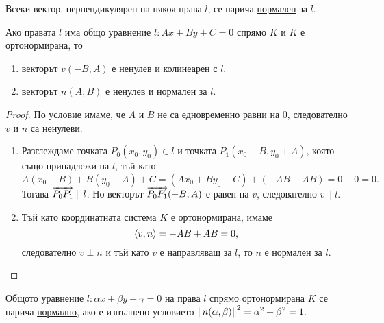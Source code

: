 \documentclass[numbers=endperiod, DIV=15]{scrartcl}
\begin{document}
\begin{definition}
  Всеки вектор, перпендикулярен на някоя права $l$, се нарича \underline{нормален} за $l$.
\end{definition}

\begin{proposition}
  Ако правата $l$ има общо уравнение $l: Ax + By + C = 0$ спрямо $K$ и $K$ е ортонормирана, то
  \begin{enumerate}
    \item векторът $v(-B, A)$ е ненулев и колинеарен с $l$.
    \item векторът $n(A, B)$ е ненулев и нормален за $l$.
  \end{enumerate}
\end{proposition}
\begin{proof}
  По условие имаме, че $A$ и $B$ не са едновременно равни на $0$, следователно $v$ и $n$ са ненулеви.
  \begin{enumerate}
    \item Разглеждаме точката $P_0(x_0, y_0) \in l$ и точката $P_1(x_0 - B, y_0 + A)$, която също принадлежи на $l$, тъй като
    \begin{displaymath}
      A(x_0 - B) + B(y_0 + A) + C = (Ax_0 + By_0 + C) + (-AB + AB) = 0 + 0 = 0.
    \end{displaymath}
     Тогава $\overrightarrow{P_0 P_1} \parallel l$. Но векторът $\overrightarrow{P_0 P_1}(-B, A)$ е равен на $v$, следователно $v \parallel l$.

    \item Тъй като координатната система $K$ е ортонормирана, имаме
    \begin{displaymath}
      \left\langle v, n \right\rangle = -AB + AB = 0,
    \end{displaymath}
    следователно $v \perp n$ и тъй като $v$ е направляващ за $l$, то $n$ е нормален за $l$.
  \end{enumerate}
\end{proof}

\begin{definition}
  Общото уравнение $l: \alpha x + \beta y + \gamma = 0$ на права $l$ спрямо ортонормирана $K$ се нарича \underline{нормално}, ако е изпълнено условието $\left\Vert n(\alpha, \beta) \right\Vert^2 = \alpha^2 + \beta^2 = 1$.
\end{definition}
\end{document}
